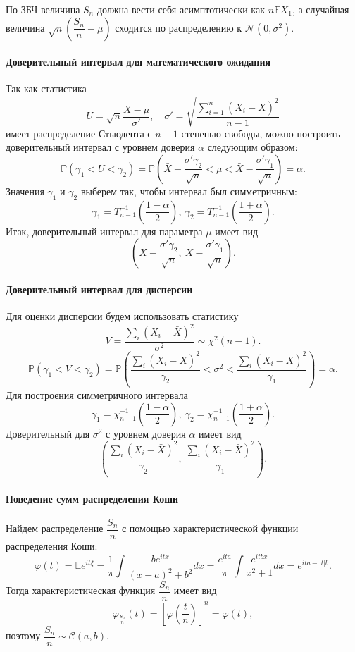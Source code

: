 \documentclass[16pt]{article}
\newcommand{\Me}{\mathbb{E}}
\begin{document}
По ЗБЧ величина $S_n$ должна вести себя асимптотически как $n\Me X_1$, а случайная величина $\sqrt{n}\left(\dfrac{S_n}{n} - \mu\right)$ сходится по распределению к $\mathcal{N}(0, \sigma^2)$. 

\paragraph{Доверительный интервал для математического ожидания}
Так как статистика $$U = \sqrt{n}\frac{\bar X - \mu}{\sigma'}, \quad \sigma' = \sqrt{\dfrac{\sum_{i=1}^n(X_i - \bar X)^2}{n-1}}$$
имеет \cite{DeGroot} распределение Стьюдента с $n - 1$ степенью свободы, можно построить доверительный интервал с уровнем доверия $\alpha$ следующим образом:
$$\mathbb{P}(\gamma_1 < U < \gamma_2) = \mathbb{P}\left(\bar X - \frac{\sigma'\gamma_2}{\sqrt{n}} < \mu < \bar X - \frac{\sigma'\gamma_1}{\sqrt{n}}\right) = \alpha.$$
Значения $\gamma_1$ и $\gamma_2$ выберем так, чтобы интервал был симметричным:
$$\gamma_1 = T^{-1}_{n-1}\left(\frac{1 - \alpha}{2}\right),\  \gamma_2 = T^{-1}_{n-1}\left(\frac{1 + \alpha}{2}\right).$$
Итак, доверительный интервал для параметра $\mu$ имеет вид
$$\left(\bar X - \frac{\sigma'\gamma_2}{\sqrt{n}}, \ \bar X - \frac{\sigma'\gamma_1}{\sqrt{n}}\right).$$

\paragraph{Доверительный интервал для дисперсии}
Для оценки дисперсии будем использовать статистику
$$V = \frac{\sum_i(X_i - \bar X)^2}{\sigma^2} \sim \chi^2(n - 1).$$
$$\mathbb{P}(\gamma_1 < V < \gamma_2) = \mathbb{P}\left(\frac{\sum_i(X_i - \bar X)^2}{\gamma_2} < \sigma^2 < \frac{\sum_i(X_i - \bar X)^2}{\gamma_1}\right) = \alpha.$$
Для построения симметричного интервала
$$\gamma_1 = \chi_{n-1}^{-1}\left(\frac{1-\alpha}{2}\right), \ \gamma_2 = \chi_{n-1}^{-1}\left(\frac{1+\alpha}{2}\right).$$
Доверительный для $\sigma^2$ с уровнем доверия $\alpha$ имеет вид
$$\left(\frac{\sum_i(X_i - \bar X)^2}{\gamma_2}, \ \frac{\sum_i(X_i - \bar X)^2}{\gamma_1}\right).$$

\paragraph{Поведение сумм распределения Коши}
Найдем распределение $\dfrac{S_n}{n}$ с помощью характеристической функции распределения Коши:
$$\varphi(t) = \mathbb{E}e^{it\xi} = \frac1\pi\int\frac{be^{itx}}{(x - a)^2 + b^2}dx = \frac{e^{ita}}{\pi}\int\frac{e^{itbx}}{x^2 + 1}dx = e^{ita - |t|b}.$$
Тогда характеристическая функция $\dfrac{S_n}{n}$ имеет вид
$$\varphi_{\frac{S_n}{n}}(t) = \left[\varphi\left(\frac{t}{n}\right)\right]^n = \varphi(t),$$
поэтому $\dfrac{S_n}{n} \sim \mathcal{C}(a, b)$.
\end{document}
